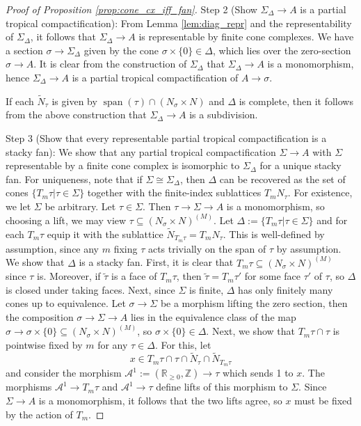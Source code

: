 \documentclass[11pt]{amsart}
\theoremstyle{definition}
\theoremstyle{remark}
\DeclareMathOperator{\Span}{span}
\begin{document}
\begin{proof}[Proof of Proposition \ref{prop:cone_cx_iff_fan}]
	Step 2 (Show $\Sigma_{\Delta}\to A$ is a partial tropical compactification): From Lemma \ref{lem:diag_repr} and the representability of $\Sigma_{\Delta}$, it follows that $\Sigma_{\Delta}\to A$
	is representable by finite cone complexes. We have a section $\sigma\to \Sigma_{\Delta}$ given by the cone $\sigma\times\{0\}\in \Delta$,
	which lies over the zero-section $\sigma\to A$. It is clear from the construction of $\Sigma_{\Delta}$ that $\Sigma_{\Delta}\to A$
	is a monomorphism, hence $\Sigma_{\Delta}\to A$ is a partial tropical compactification of $A\to \sigma$.

	If each $\tilde{N}_{\tau}$ is given by $\Span(\tau)\cap (N_{\sigma}\times N)$ and $\Delta$ is complete, then it follows from the
	above construction that $\Sigma_{\Delta}\to A$ is a subdivision.

	Step 3 (Show that every representable partial tropical compactification is a stacky fan): We show that any partial tropical compactification $\Sigma\to A$ with $\Sigma$ representable by a finite cone complex is isomorphic
	to $\Sigma_{\Delta}$ for a unique stacky fan. For uniqueness, note that if $\Sigma\cong \Sigma_{\Delta}$, then $\Delta$
	can be recovered as the set of cones $\{T_m\tau|\tau\in \Sigma\}$ together with the finite-index sublattices
	$T_m N_{\tau}$. For existence, we let $\Sigma$ be arbitrary. Let $\tau\in \Sigma$. Then $\tau\to \Sigma\to A$ is a monomorphism,
	so choosing a lift, we may view $\tau\subseteq(N_{\sigma}\times N)^{(M)}$. Let $\Delta:=\{T_m\tau|\tau\in \Sigma\}$
	and for each $T_m\tau$ equip it with the sublattice $\tilde{N}_{T_m \tau}=T_m N_{\tau}$. This is well-defined by assumption, since any
	$m$ fixing $\tau$ acts trivially on the span of $\tau$ by assumption. We show that $\Delta$ is a stacky
	fan. First, it is clear that $T_m \tau\subseteq (N_{\sigma}\times N)^{(M)}$ since $\tau$ is. Moreover, if $\tilde{\tau}$ is a
	face of $T_m \tau$, then $\tilde{\tau}=T_m \tau'$ for some face $\tau'$ of $\tau$, so $\Delta$ is closed under taking faces. Next,
	since $\Sigma$ is finite, $\Delta$ has only finitely many cones up to equivalence. Let $\sigma\to \Sigma$ be a morphism lifting
	the zero section, then the composition $\sigma\to \Sigma\to A$ lies in the equivalence class of the map $\sigma\to \sigma\times \{0\}\subseteq (N_{\sigma}\times N)^{(M)}$,
	so $\sigma\times\{0\}\in \Delta$. Next, we show that $T_{m}\tau\cap \tau$ is pointwise fixed by $m$ for any $\tau\in \Delta$.
	For this, let
	$$x\in T_m\tau\cap\tau\cap \tilde{N}_{\tau}\cap \tilde{N}_{T_m\tau}$$
	and consider the morphism $\mathcal{A}^{1}:=(\mathbb{R}_{\ge 0},\mathbb{Z})\to \tau$
	which sends 1 to $x$. The morphisms $\mathcal{A}^{1}\to T_m\tau$ and $\mathcal{A}^{1}\to \tau$ define lifts of this morphism
	to $\Sigma$. Since $\Sigma\to A$ is a monomorphism, it follows that the two lifts agree, so $x$ must be fixed by the action of $T_m$.


\end{proof}
\end{document}
